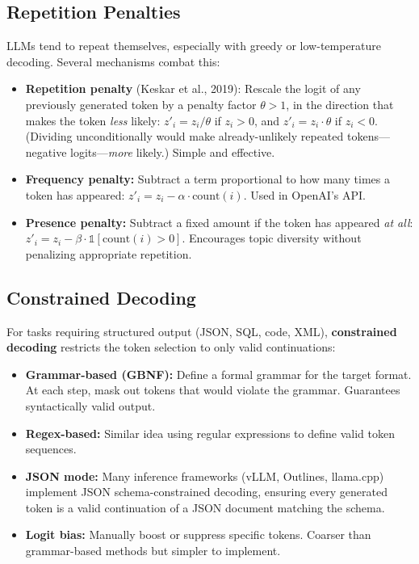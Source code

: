 \subsection{Repetition Penalties}

LLMs tend to repeat themselves, especially with greedy or low-temperature
decoding.  Several mechanisms combat this:

\begin{itemize}
    \item \textbf{Repetition penalty} (Keskar et al., 2019): Rescale the logit
          of any previously generated token by a penalty factor $\theta > 1$,
          in the direction that makes the token \emph{less} likely:
          $z'_i = z_i / \theta$ if $z_i > 0$, and $z'_i = z_i \cdot \theta$ if
          $z_i < 0$.  (Dividing unconditionally would make already-unlikely
          repeated tokens---negative logits---\emph{more} likely.)  Simple and
          effective.
    \item \textbf{Frequency penalty:} Subtract a term proportional to how many
          times a token has appeared: $z'_i = z_i - \alpha \cdot \text{count}(i)$.
          Used in OpenAI's API.
    \item \textbf{Presence penalty:} Subtract a fixed amount if the token has
          appeared \emph{at all}: $z'_i = z_i - \beta \cdot \mathds{1}[\text{count}(i) > 0]$.
          Encourages topic diversity without penalizing appropriate repetition.
\end{itemize}

\subsection{Constrained Decoding}

For tasks requiring structured output (JSON, SQL, code, XML), \textbf{constrained
decoding} restricts the token selection to only valid continuations:

\begin{itemize}
    \item \textbf{Grammar-based (GBNF):} Define a formal grammar for the target
          format.  At each step, mask out tokens that would violate the grammar.
          Guarantees syntactically valid output.
    \item \textbf{Regex-based:} Similar idea using regular expressions to define
          valid token sequences.
    \item \textbf{JSON mode:} Many inference frameworks (vLLM, Outlines, llama.cpp)
          implement JSON schema-constrained decoding, ensuring every generated
          token is a valid continuation of a JSON document matching the schema.
    \item \textbf{Logit bias:} Manually boost or suppress specific tokens.
          Coarser than grammar-based methods but simpler to implement.
\end{itemize}


